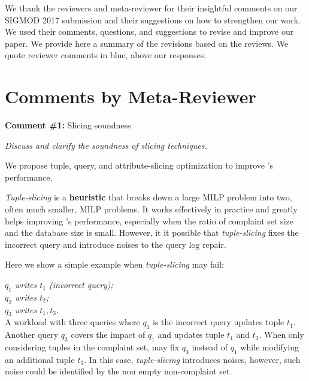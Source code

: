 


\newcommand{\reviewer}[1]{\itshape{{\color{commentColor} #1}}}
\newcommand{\comskip}{\bigskip}


\renewenvironment{quote}
{\vspace{-1mm}\list{}{\rightmargin=0cm \leftmargin=0cm}%
\item\relax}
{\endlist}

We thank the reviewers and meta-reviewer for their insightful comments on our
SIGMOD 2017 submission and their suggestions on how to strengthen our work. We
used their comments, questions, and suggestions to revise and improve our
paper. We provide here a summary of the revisions based on the reviews. We
quote reviewer comments in blue, above our responses.

\section*{Comments by Meta-Reviewer}

\noindent
\textbf{Comment \#1:} Slicing soundness
\begin{quote}
\reviewer{
Discuss and clarify the soundness of slicing techniques.
}
\end{quote}

We propose tuple, query, and attribute-slicing optimization to improve \sys's
performance.

\emph{Tuple-slicing} is a \textbf{heuristic} that breaks down a large MILP problem 
into two, often much smaller, MILP problems. It works effectively in practice and 
greatly helps improving \sys's performance, especially when the ratio of complaint 
set size and the database size is small. However, it it possible that \emph{tuple-slicing} 
fixes the incorrect query and introduce noises to the query log repair. 

Here we show a simple example when \emph{tuple-slicing} may fail:


\indent \textit{$q_1$ writes $t_1$ (incorrect query); \\
\indent $q_2$ writes $t_2$;\\
\indent $q_3$ writes $t_1, t_3$.}\\
A workload with three queries where $q_1$ is the incorrect query updates tuple $t_1$. 
Another query $q_3$ covers the impact of $q_1$ and updates tuple $t_1$ and $t_3$. 
When only considering tuples in the complaint set, \sys may fix $q_3$ instead of $q_1$ 
while modifying an additional tuple $t_3$. In this case, \emph{tuple-slicing} introduces 
noises, however, such noise could be identified by the non empty non-complaint set. 

